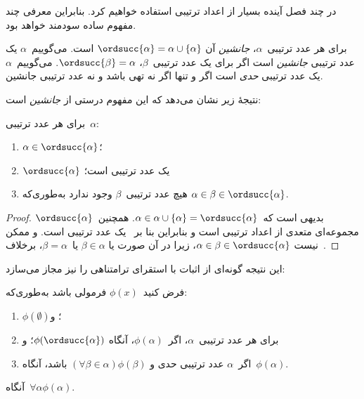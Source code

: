 \documentclass[../../../include/open-logic-section]{subfiles}
\begin{document}

در چند فصل آینده بسیار از اعداد ترتیبی استفاده خواهیم کرد. بنابراین معرفی
چند مفهوم ساده سودمند خواهد بود.

\begin{defn}
برای هر عدد ترتیبی~$\alpha$، \emph{جانشین} آن
$\ordsucc{\alpha}=\alpha\cup\{\alpha\}$ است. می‌گوییم~$\alpha$ یک عدد
ترتیبی \emph{جانشین} است اگر برای یک عدد ترتیبی~$\beta$،
$\ordsucc{\beta}=\alpha$. می‌گوییم~$\alpha$ یک عدد ترتیبی \emph{حدی}
است اگر و تنها اگر نه تهی باشد و نه عدد ترتیبی جانشین.
\end{defn}
\noindent
نتیجهٔ زیر نشان می‌دهد که این مفهوم درستی از \emph{جانشین} است:

\begin{prop}
برای هر عدد ترتیبی~$\alpha$:
\begin{enumerate}
	\item $\alpha \in \ordsucc{\alpha}$؛
	\item $\ordsucc{\alpha}$ یک عدد ترتیبی است؛
	\item هیچ عدد ترتیبی~$\beta$ وجود ندارد به‌طوری‌که
	$\alpha \in \beta \in \ordsucc{\alpha}$.
	\end{enumerate}
\end{prop}

\begin{proof}
بدیهی است که~$\alpha\in\alpha\cup\{\alpha\}=\ordsucc{\alpha}$.
همچنین~$\ordsucc{\alpha}$ مجموعه‌ای متعدی از اعداد ترتیبی است و بنابراین
بنا بر~ یک عدد ترتیبی است. و ممکن نیست
$\alpha\in\beta\in\ordsucc{\alpha}$، زیرا در آن صورت یا
$\beta\in\alpha$ یا~$\beta=\alpha$، برخلاف~.
\end{proof}
\noindent
این نتیجه گونه‌ای از اثبات با استقرای ترامتناهی را نیز مجاز می‌سازد:

\begin{thm}
فرض کنید~$\phi(x)$ فرمولی باشد به‌طوری‌که:
\begin{enumerate}
	\item $\phi(\emptyset)$؛ و
	\item برای هر عدد ترتیبی~$\alpha$، اگر~$\phi(\alpha)$، آنگاه
	$\phi(\ordsucc{\alpha})$؛ و
	\item اگر~$\alpha$ عدد ترتیبی حدی و
	$(\forall \beta \in \alpha)\phi(\beta)$ باشد، آنگاه~$\phi(\alpha)$.
\end{enumerate}
آنگاه~$\forall \alpha \phi(\alpha)$.
\end{thm}
\end{document}
